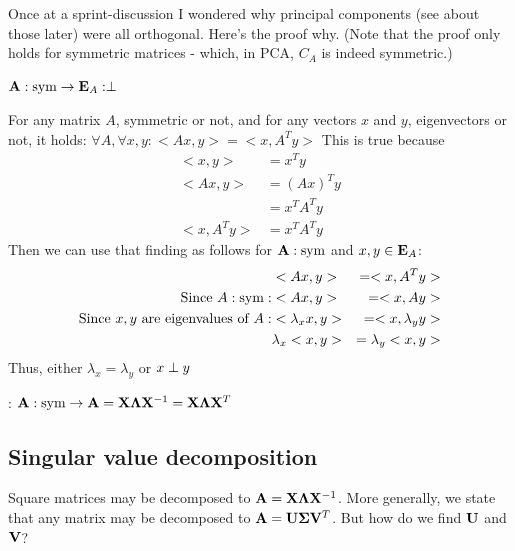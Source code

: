 Once at a sprint-discussion I wondered why principal components (see about those later) were all orthogonal. Here's the proof why. (Note that the proof only holds for symmetric matrices - which, in PCA, $C_A$ is indeed symmetric.)
\begin{theorem} \label{symm_then_orth}
    $\mathbf{A}: \text{sym} \to \mathbf{E}_A: \perp$

    For any matrix $A$, symmetric or not, and for any vectors $x$ and $y$, eigenvectors or not, it holds:
    $\forall A, \forall x, y: <Ax, y> = <x, A^Ty>$
    This is true because 
    \begin{equation}
        \begin{aligned}
            <x, y>      &= x^T y \\
            <Ax, y>     &= (Ax)^T y \\
                        &= x^T A^T y \\
            <x, A^Ty>   &= x^T A^T y
        \end{aligned}
    \end{equation}
    Then we can use that finding as follows for $\mathbf{A}: \text{sym}$ and $x, y \in \mathbf{E}_A$:
    \begin{equation}
        \begin{aligned}
                                                                & <Ax, y>           &= <x, A^Ty> \\
            \text{Since } A:\text{sym}:                              & <Ax, y>           &= <x, Ay> \\
            \text{Since } x, y \text{ are eigenvalues of } A:   & <\lambda_x x, y>  &= <x, \lambda_y y> \\
                                                                & \lambda_x <x, y>  &= \lambda_y <x, y>
        \end{aligned}
    \end{equation}
    Thus, either $\lambda_x = \lambda_y$ or $x \perp y$ 
\end{theorem}

\begin{theorem}
    : $\mathbf{A}: \text{sym} \to \mathbf{A} = \mathbf{X} \mathbf{\Lambda} \mathbf{X}^{-1} = \mathbf{X} \mathbf{\Lambda} \mathbf{X}^T$
\end{theorem}



\subsection{Singular value decomposition}
Square matrices may be decomposed to $\mathbf{A} = \mathbf{X} \mathbf{\Lambda} \mathbf{X}^{-1}$.
More generally, we state that any matrix may be decomposed to $\mathbf{A} = \mathbf{U} \mathbf{\Sigma} \mathbf{V}^T$.
But how do we find $\mathbf{U}$ and $\mathbf{V}$?

